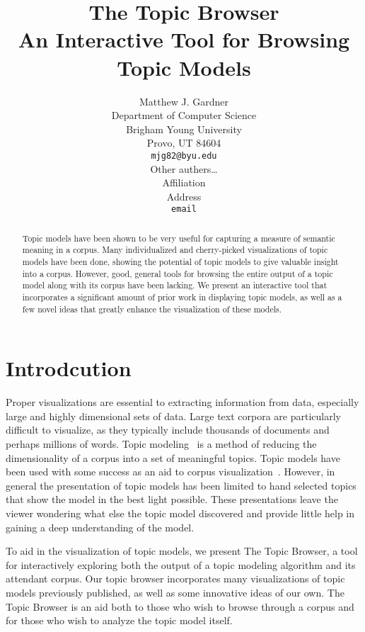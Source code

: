 \documentclass{article}
\title{The Topic Browser\\An Interactive Tool for Browsing Topic Models}
\author{
Matthew J. Gardner \\
Department of Computer Science \\
Brigham Young University \\
Provo, UT 84604 \\
\texttt{mjg82@byu.edu} \\
\And
Other authers\ldots \\
Affiliation \\
Address \\
\texttt{email} \\
}
\begin{document}
\maketitle

\begin{abstract}

Topic models have been shown to be very useful for capturing a measure of
semantic meaning in a corpus.  Many individualized and cherry-picked
visualizations of topic models have been done, showing the potential of topic
models to give valuable insight into a corpus.  However, good, general tools
for browsing the entire output of a topic model along with its corpus have been
lacking.  We present an interactive tool that incorporates a significant amount
of prior work in displaying topic models, as well as a few novel ideas that
greatly enhance the visualization of these models.

\end{abstract}

\section{Introdcution}

Proper visualizations are essential to extracting information from data,
especially large and highly dimensional sets of data.  Large text corpora are
particularly difficult to visualize, as they typically include thousands of
documents and perhaps millions of words.  Topic
modeling~\cite{blei-2003-latent-dirichlet-allocation} is a method of reducing
the dimensionality of a corpus into a set of meaningful topics.  Topic models
have been used with some success as an aid to corpus
visualization~\cite{blei-2009-topic-models,
newman-2010-visualizing-with-topic-maps}.  However, in general the presentation
of topic models has been limited to hand selected topics that show the model in
the best light possible.  These presentations leave the viewer wondering what
else the topic model discovered and provide little help in gaining a deep
understanding of the model.

To aid in the visualization of topic models, we present The Topic Browser, a
tool for interactively exploring both the output of a topic modeling algorithm
and its attendant corpus.  Our topic browser incorporates many visualizations
of topic models previously published, as well as some innovative ideas of our
own.  The Topic Browser is an aid both to those who wish to browse through a
corpus and for those who wish to analyze the topic model itself.
\end{document}
